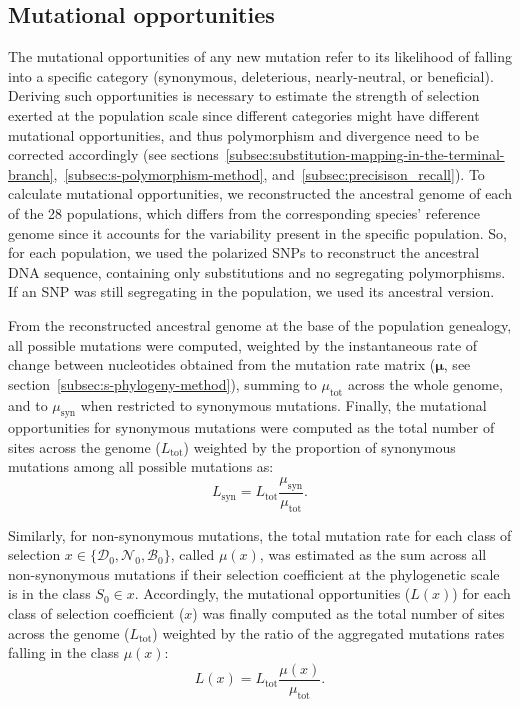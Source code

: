 \documentclass[12pt]{article}
\newcommand{\UniDimArray}[1]{\bm{#1}}
\newcommand{\Sphy}{S_{0}}
\newcommand{\SphyDel}{\mathcal{D}_0}
\newcommand{\SphyNeu}{\mathcal{N}_0}
\newcommand{\SphyBen}{\mathcal{B}_0}
\newcommand{\Sphyclass}{x}
\begin{document}
    \subsection{Mutational opportunities}
    \label{subsec:nunber-of-sites}
    The mutational opportunities of any new mutation refer to its likelihood of falling into a specific category (synonymous, deleterious, nearly-neutral, or beneficial).
    Deriving such opportunities is necessary to estimate the strength of selection exerted at the population scale since different categories might have different mutational opportunities, and thus polymorphism and divergence need to be corrected accordingly (see sections~\ref{subsec:substitution-mapping-in-the-terminal-branch},~\ref{subsec:s-polymorphism-method}, and~\ref{subsec:precisison_recall}).
    To calculate mutational opportunities, we reconstructed the ancestral genome of each of the 28 populations, which differs from the corresponding species' reference genome since it accounts for the variability present in the specific population.
    So, for each population, we used the polarized SNPs to reconstruct the ancestral DNA sequence, containing only substitutions and no segregating polymorphisms.
    If an SNP was still segregating in the population, we used its ancestral version.

    From the reconstructed ancestral genome at the base of the population genealogy, all possible mutations were computed, weighted by the instantaneous rate of change between nucleotides obtained from the mutation rate matrix ($\UniDimArray{\mu}$, see section~\ref{subsec:s-phylogeny-method}), summing to $\mu_{\text{tot}}$ across the whole genome, and to $\mu_{\text{syn}}$ when restricted to synonymous mutations.
    Finally, the mutational opportunities for synonymous mutations were computed as the total number of sites across the genome ($L_{\text{tot}}$) weighted by the proportion of synonymous mutations among all possible mutations as:
    \begin{equation}
        L_{\text{syn}} = L_{\text{tot}} \frac{\mu_{\text{syn}}}{\mu_{\text{tot}}}.
    \end{equation}

    Similarly, for non-synonymous mutations, the total mutation rate for each class of selection $\Sphyclass \in \{\SphyDel, \SphyNeu, \SphyBen \}$, called $\mu\left( \Sphyclass \right)$, was estimated as the sum across all non-synonymous mutations if their selection coefficient at the phylogenetic scale is in the class $\Sphy \in \Sphyclass$.
    Accordingly, the mutational opportunities ($L \left( \Sphyclass \right)$) for each class of selection coefficient ($\Sphyclass$) was finally computed as the total number of sites across the genome ($L_{\text{tot}}$) weighted by the ratio of the aggregated mutations rates falling in the class $\mu\left( \Sphyclass \right)$:
    \begin{equation}
        L \left( \Sphyclass \right) = L_{\text{tot}} \frac{\mu\left( \Sphyclass \right)}{\mu_{\text{tot}}}.
    \end{equation}
\end{document}
